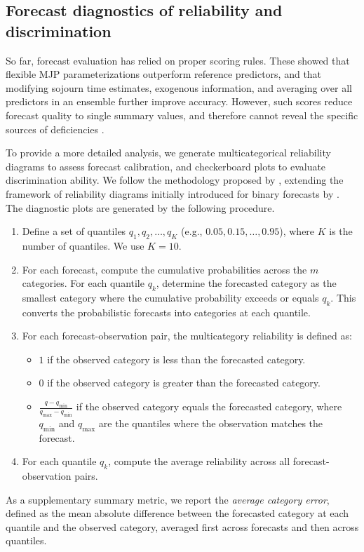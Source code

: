 \subsection{Forecast diagnostics of reliability and discrimination} \label{sec:reliability_analysis}
So far, forecast evaluation has relied on proper scoring rules. These showed that flexible MJP parameterizations outperform reference predictors, and that modifying sojourn time estimates, exogenous information, and averaging over all predictors in an ensemble further improve accuracy. However, such scores reduce forecast quality to single summary values, and therefore cannot reveal the specific sources of deficiencies \citep{hamill1997,Dimitriadis_2024}. 

To provide a more detailed analysis, we generate multicategorical reliability diagrams to assess forecast calibration, and checkerboard plots to evaluate discrimination ability.
We follow the methodology proposed by \citet{hamill1997}, extending the framework of reliability diagrams initially introduced for binary forecasts by \citet{wilks1995a}.
The diagnostic plots are generated by the following procedure.
\begin{enumerate}    
    \item Define a set of quantiles $q_1, q_2, \dots, q_K$ (e.g., $0.05, 0.15, \dots, 0.95$), where $K$ is the number of quantiles. We use $K = 10$.
    \item For each forecast, compute the cumulative probabilities across the $m$ categories. For each quantile $q_k$, determine the forecasted category as the smallest category where the cumulative probability exceeds or equals $q_k$. This converts the probabilistic forecasts into categories at each quantile.
    \item For each forecast-observation pair, the multicategory reliability is defined as:
    \begin{itemize}
        \item $1$ if the observed category is less than the forecasted category.
        \item $0$ if the observed category is greater than the forecasted category.
        \item $\frac{q - q_{\min}}{q_{\max} - q_{\min}}$ if the observed category equals the forecasted category, where $q_{\min}$ and $q_{\max}$ are the quantiles where the observation matches the forecast.
    \end{itemize}
    \item For each quantile $q_k$, compute the average reliability across all forecast-observation pairs.
\end{enumerate}
As a supplementary summary metric, we report the \textit{average category error}, defined as the mean absolute difference between the forecasted category at each quantile and the observed category, averaged first across forecasts and then across quantiles.

